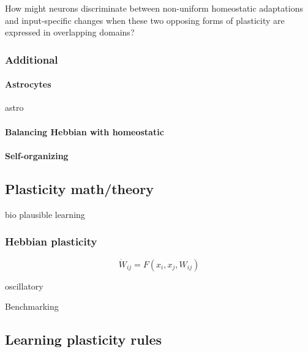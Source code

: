\documentclass{article}
\theoremstyle{definition} \newtheorem{definition}{Definition}
\theoremstyle{remark} \newtheorem{remark}{Remark}
\newcounter{ct}
\begin{document}
How might neurons discriminate between non-uniform homeostatic adaptations and input-specific changes when these two opposing forms of plasticity are expressed in overlapping domains? \citep{rabinowitch2006interplay, rabinowitch2008two}
 
 
\subsubsection{Additional}
\paragraph{Astrocytes} 
astro\citep{depitta2016astrocytes}
\citep{koshkin2024astrocyte}

\paragraph{Balancing Hebbian with homeostatic}
\citep{zenke2017temporal}

\paragraph{Self-organizing}
\citep{federer2018self}
\citep{kohonen2012self, kohonen2013essentials}

\subsection{Plasticity math/theory}
\citep{gerstner2002mathematical}
\citep{berner2023adaptive}
\citep{clark2024theory}
\citep{tyulmankov2024computational}

bio plausible learning\citep{miconi2017biologically}

\subsubsection{Hebbian plasticity}
\citep{caporale2008spike}
\begin{equation}
\dot W_{ij} = F(x_i, x_j, W_{ij})
\end{equation}

oscillatory\citep{winder2009oscillatory}

Benchmarking \citep{lansner2023benchmarking}

\subsection{Learning plasticity rules} %
\citep{pereira2018attractor}
\end{document}
